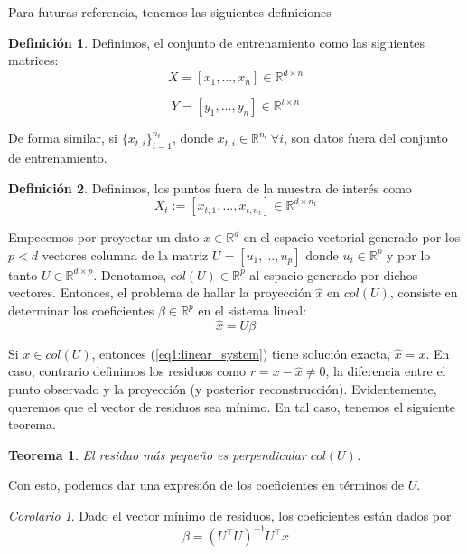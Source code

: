\documentclass{article}
\numberwithin{equation}{section}
\newtheorem{theorem}{Teorema}
\theoremstyle{remark}
\theoremstyle{definition}
\newtheorem{definition}{Definición}
\theoremstyle{remark}
\newtheorem{corollary}{Corolario}
\theoremstyle{remark}
\begin{document}
Para futuras referencia, tenemos las siguientes definiciones
\begin{definition}
    \label{df:training_sets}
    Definimos, el conjunto de entrenamiento como las siguientes matrices:
    $$X = [x_1, \ldots, x_n] \in \mathbb{R}^{d \times n}$$

    $$Y = [y_1, \ldots, y_n] \in \mathbb{R}^{l \times n}$$
\end{definition}

De forma similar, si $\{x_{t,i}\}_{i=1}^{n_t}$, donde $x_{t,i} \in \mathbb{R}^{n_t}\ \forall i$, son datos fuera del conjunto de entrenamiento.
\begin{definition}
    \label{df:outraining_set}
    Definimos, los puntos fuera de la muestra de interés como 
    $$X_t := [x_{t,1}, \ldots, x_{t,n_t}] \in \mathbb{R}^{d \times n_t}$$
\end{definition}

Empecemos por proyectar un dato $x \in \mathbb{R}^d$ en el espacio vectorial generado por los $p < d$ vectores columna de la matriz $U = [u_1, \ldots, u_p]$ donde $u_i \in \mathbb{R}^p$ 
y por lo tanto $U \in \mathbb{R}^{d \times p}$. Denotamos, $col(U) \in \mathbb{R}^p$ al espacio generado por dichos vectores.
Entonces, el problema de hallar la proyección $\hat{x}$ en $col(U)$, consiste en determinar los coeficientes $\beta \in \mathbb{R}^p$ en el sistema lineal:
\begin{equation}
    \label{eq1:linear_system}
    \hat{x} = U \beta
\end{equation}

Si $x \in col(U)$, entonces (\ref{eq1:linear_system}) tiene solución exacta, $\hat{x} = x$.
En caso, contrario definimos los residuos como $r = x - \hat{x} \neq 0$, la diferencia entre el punto observado y la proyección (y posterior reconstrucción).
Evidentemente, queremos que el vector de residuos sea mínimo. En tal caso, tenemos el siguiente teorema.
\begin{theorem}
\label{t1:resmin_perp_colu}    
El residuo más pequeño es perpendicular $col(U)$.
\end{theorem}

Con esto, podemos dar una expresión de los coeficientes en términos de $U$.

\begin{corollary}
    Dado el vector mínimo de residuos, los coeficientes están dados por
    $$\beta = (U^\intercal U)^{-1} U^\intercal x$$
\end{corollary}
\end{document}
